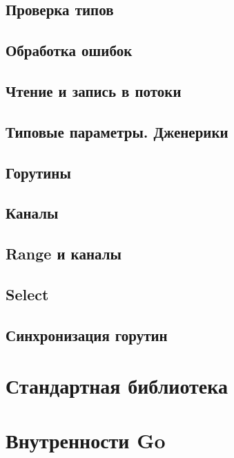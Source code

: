 \documentclass{article}
\begin{document}
        \subsection{Проверка типов}
        \subsection{Обработка ошибок}
        \subsection{Чтение и запись в потоки}
        \subsection{Типовые параметры. Дженерики}
        \subsection{Горутины}
        \subsection{Каналы}
        \subsection{Range и каналы}
        \subsection{Select}
        \subsection{Синхронизация горутин}

    \section{Стандартная библиотека}

    \section{Внутренности Go}
\end{document}
